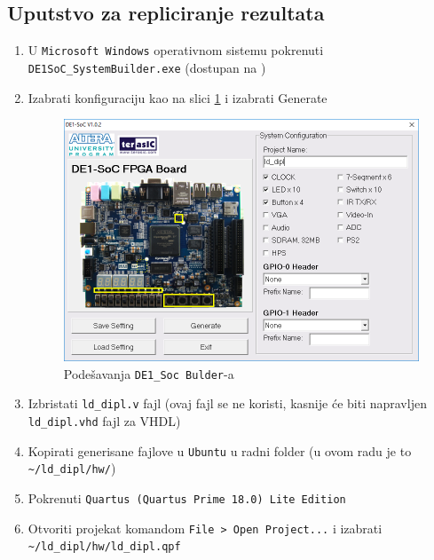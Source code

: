 \newcommand\tab[1][1cm]{\hspace*{#1}}
\subsection{Uputstvo za repliciranje rezultata}

\begin{enumerate}

\subsubsection{Projektovanje u Quartus-u}
\item U \texttt{Microsoft Windows} operativnom sistemu pokrenuti \texttt{DE1SoC\_SystemBuilder.exe} (dostupan na \cite{de11})
\item Izabrati konfiguraciju kao na slici \ref{slika:sb} i izabrati Generate\\
\begin{figure}[h!]
\centering
\includegraphics[scale=0.6]{img/DE1SoC_SystemBuilder.png}
\caption{Podešavanja \texttt{DE1\_Soc Bulder}-a}
\label{slika:sb}
\end{figure}
\item  Izbristati \texttt{ld\_dipl.v} fajl (ovaj fajl se ne koristi, kasnije će biti napravljen \texttt{ld\_dipl.vhd} fajl za VHDL)
\item  Kopirati generisane fajlove u \texttt{Ubuntu} u radni folder (u ovom radu je to \texttt{\textasciitilde/ld\_dipl/hw/})
\item  Pokrenuti \texttt{Quartus (Quartus Prime 18.0) Lite Edition}
\item  Otvoriti projekat komandom \texttt{File > Open Project...} i izabrati \texttt{\textasciitilde/ld\_dipl/hw/ld\_dipl.qpf}

\end{enumerate}

